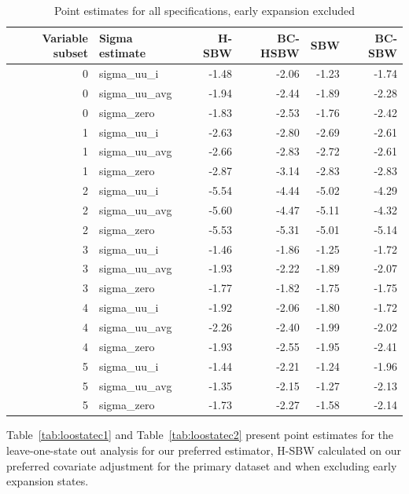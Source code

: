 \documentclass{article}
\begin{document}
\begin{appendix}
\begin{table}[ht]
\centering
   \caption{Point estimates for all specifications, early expansion excluded}
    \label{tab:secondaryptests}
\begin{tabular}{rlrrrr}
  \hline
Variable subset & Sigma estimate & H-SBW & BC-HSBW & SBW & BC-SBW \\ 
  \hline
0 & sigma\_uu\_i & -1.48 & -2.06 & -1.23 & -1.74 \\ 
  0 & sigma\_uu\_avg & -1.94 & -2.44 & -1.89 & -2.28 \\ 
  0 & sigma\_zero & -1.83 & -2.53 & -1.76 & -2.42 \\ 
  1 & sigma\_uu\_i & -2.63 & -2.80 & -2.69 & -2.61 \\ 
  1 & sigma\_uu\_avg & -2.66 & -2.83 & -2.72 & -2.61 \\ 
  1 & sigma\_zero & -2.87 & -3.14 & -2.83 & -2.83 \\ 
  2 & sigma\_uu\_i & -5.54 & -4.44 & -5.02 & -4.29 \\ 
  2 & sigma\_uu\_avg & -5.60 & -4.47 & -5.11 & -4.32 \\ 
  2 & sigma\_zero & -5.53 & -5.31 & -5.01 & -5.14 \\ 
  3 & sigma\_uu\_i & -1.46 & -1.86 & -1.25 & -1.72 \\ 
  3 & sigma\_uu\_avg & -1.93 & -2.22 & -1.89 & -2.07 \\ 
  3 & sigma\_zero & -1.77 & -1.82 & -1.75 & -1.75 \\ 
  4 & sigma\_uu\_i & -1.92 & -2.06 & -1.80 & -1.72 \\ 
  4 & sigma\_uu\_avg & -2.26 & -2.40 & -1.99 & -2.02 \\ 
  4 & sigma\_zero & -1.93 & -2.55 & -1.95 & -2.41 \\ 
  5 & sigma\_uu\_i & -1.44 & -2.21 & -1.24 & -1.96 \\ 
  5 & sigma\_uu\_avg & -1.35 & -2.15 & -1.27 & -2.13 \\ 
  5 & sigma\_zero & -1.73 & -2.27 & -1.58 & -2.14 \\ 
   \hline
\end{tabular}
\end{table}

Table~\ref{tab:loostatec1} and Table~\ref{tab:loostatec2} present point estimates for the leave-one-state out analysis for our preferred estimator, H-SBW calculated on our preferred covariate adjustment for the primary dataset and when excluding early expansion states.


\end{appendix}
\end{document}
